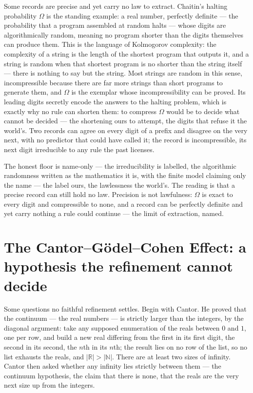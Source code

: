 Some records are precise and yet carry no law to extract. Chaitin's halting probability $\Omega$ is the
standing example: a real number, perfectly definite --- the probability that a program assembled at random
halts --- whose digits are algorithmically random, meaning no program shorter than the digits themselves can
produce them. This is the language of Kolmogorov complexity: the complexity of a string is the length of the
shortest program that outputs it, and a string is random when that shortest program is no shorter than the
string itself --- there is nothing to say but the string. Most strings are random in this sense, incompressible
because there are far more strings than short programs to generate them, and $\Omega$ is the exemplar whose
incompressibility can be proved. Its leading digits secretly encode the answers to the halting problem, which is exactly why no
rule can shorten them: to compress $\Omega$ would be to decide what cannot be decided --- the shortening ours
to attempt, the digits that refuse it the world's. Two records can agree on
every digit of a prefix and disagree on the very next, with no predictor that could have called it; the record
is incompressible, its next digit irreducible to any rule the past licenses.

The honest floor is name-only --- the irreducibility is labelled, the algorithmic randomness written as the
mathematics it is, with the finite model claiming only the name --- the label ours, the lawlessness the
world's. The reading is that a precise record can still
hold no law. Precision is not lawfulness: $\Omega$ is exact to every digit and compressible to none, and a
record can be perfectly definite and yet carry nothing a rule could continue --- the limit of extraction,
named.

\section{The Cantor--G\"odel--Cohen Effect: a hypothesis the refinement cannot decide}
\label{se:cantor-godel-cohen}

Some questions no faithful refinement settles. Begin with Cantor. He proved that the continuum --- the real
numbers --- is strictly larger than the integers, by the diagonal argument: take any supposed enumeration of
the reals between $0$ and $1$, one per row, and build a new real differing from the first in its first digit,
the second in its second, the $n$th in its $n$th; the result lies on no row of the list, so no list exhausts
the reals, and $|\mathbb{R}| > |\mathbb{N}|$. There are at least two sizes of infinity. Cantor then asked
whether any infinity lies strictly between them --- the continuum hypothesis, the claim that there is none, that
the reals are the very next size up from the integers.

